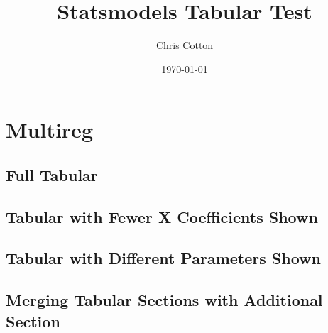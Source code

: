 \documentclass{article}
\theoremstyle{definition}
\begin{document}
\title{Statsmodels Tabular Test}
\author{Chris Cotton}
\date{\today}
\maketitle

\section{Multireg}
\subsection{Full Tabular}



\subsection{Tabular with Fewer X Coefficients Shown}



\subsection{Tabular with Different Parameters Shown}



\subsection{Merging Tabular Sections with Additional Section}


\end{document}

